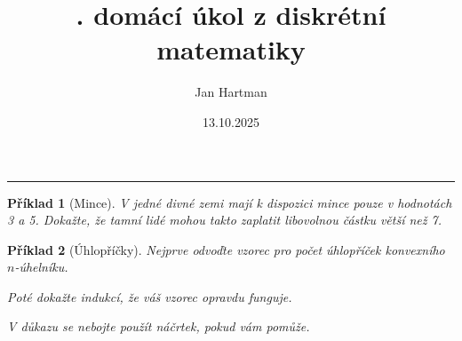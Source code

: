 \documentclass[11pt]{article}
\title{\tutnum. domácí úkol z diskrétní matematiky}
\author{Jan Hartman}
\date{13.10.2025}
\newcommand{\titlerule}{%
    \noindent %
    \makebox[\textwidth]{\large \thetitle \hfill termín: \thedate}
    \rule{\textwidth}{0.4pt}%
}
\theoremstyle{definitionstyle}
\theoremstyle{problemstyle}
\newtheorem{problem}{Příklad}
\begin{document}
\titlerule

\begin{problem}[Mince]
V jedné divné zemi mají k dispozici mince pouze v hodnotách 3 a 5. Dokažte, že tamní lidé mohou takto zaplatit libovolnou částku větší než 7.
\end{problem}

\begin{problem}[Úhlopříčky]
Nejprve odvoďte vzorec pro počet úhlopříček konvexního $n$-úhelníku.

\noindent
Poté dokažte indukcí, že váš vzorec opravdu funguje.

\noindent
\textit{V důkazu se nebojte použít náčrtek, pokud vám pomůže.}
\end{problem}
\end{document}
